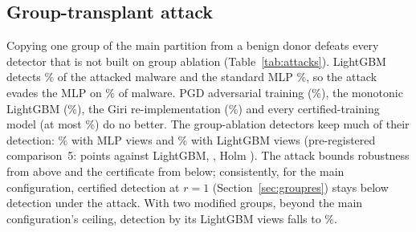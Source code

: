 \subsection{Group-transplant attack}\label{sec:gattack}
Copying one group of the main partition from a benign donor defeats every detector that is not built on group ablation (Table~\ref{tab:attacks}). LightGBM detects \FamGattackLgbm\% of the attacked malware and the standard MLP \ResGaMlp\%, so the attack evades the MLP on \ResGaMlpEvade\% of malware. PGD adversarial training (\ResGaPgdAt\%), the monotonic LightGBM (\ResGaMono\%), the Giri re-implementation (\ResGaGiri\%) and every certified-training model (at most \ResGaMaxOther\%) do no better. %
The group-ablation detectors keep much of their detection: \ResGaAblMain\% with MLP views and \FamGattackLgbmViews\% with LightGBM views (pre-registered comparison~5: \CmpEDiff{} points against LightGBM, \CmpEInt, Holm \CmpEPeq). %
The attack bounds robustness from above and the certificate from below; consistently, for the main configuration, certified detection at $r=1$ (Section~\ref{sec:groupres}) stays below detection under the attack. With two modified groups, beyond the main configuration's ceiling, detection by its LightGBM views falls to \ResGaLgbmViewsRTwo\%. %

\begin{table}[!htbp]
\centering\small
\caption{Malware detected (\%) under the group-transplant attack with $r$ groups of the main partition copied from benign donors, mean over seeds.}\label{tab:attacks}
\resizebox{\textwidth}{!}{}
\end{table}

